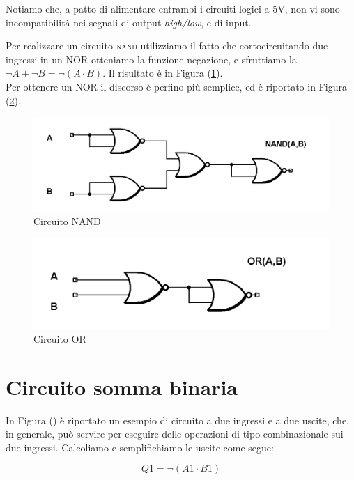 \documentclass[journal, a4paper]{IEEEtran}
\begin{document}
Notiamo che, a patto di alimentare entrambi i circuiti logici a 5V, non vi sono incompatibilità nei segnali di output \textit{high/low}, e di input.

Per realizzare un circuito \textsc{nand} utilizziamo il fatto che cortocircuitando due ingressi in un NOR otteniamo la funzione negazione, e sfruttiamo la $\lnot A + \lnot B = \lnot (A \cdot B)$. Il risultato è in Figura (\ref{fig:es17}).\\
Per ottenere un NOR il discorso è perfino più semplice, ed è riportato in Figura (\ref{fig:es18}).

\begin{figure}
\centering
\includegraphics[width=0.9\linewidth]{./es17}
\caption{Circuito NAND}
\label{fig:es17}
\end{figure}

\begin{figure}
\centering
\includegraphics[width=0.9\linewidth]{./es18}
\caption{Circuito OR}
\label{fig:es18}
\end{figure}

  

\section{Circuito somma binaria}

In Figura () è riportato un esempio di circuito a due ingressi e a due uscite, che, in generale, può servire per eseguire delle operazioni di tipo combinazionale sui due ingressi. Calcoliamo e semplifichiamo le uscite come segue:

\begin{equation}
Q1 = \lnot(A1 \cdot B1)
\end{equation}
\end{document}
